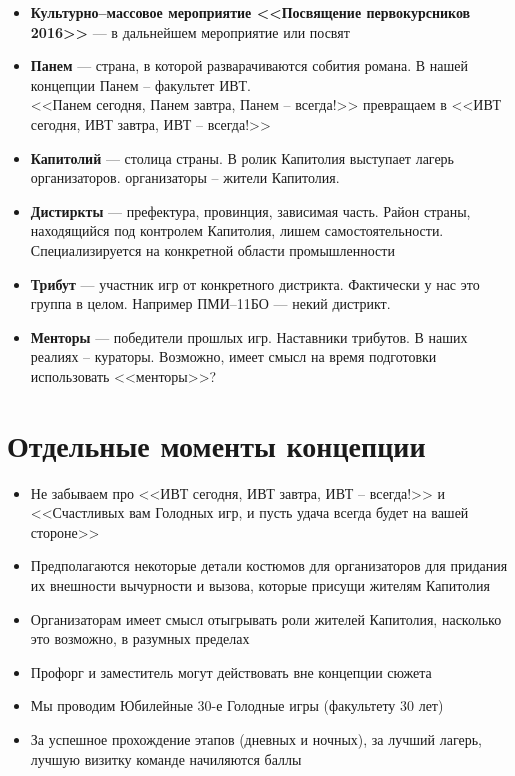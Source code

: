 \documentclass[a4paper, 14pt]{extarticle}
\theoremstyle{definition}
\begin{document}
\begin{itemize}
\item \textbf{Культурно--массовое мероприятие <<Посвящение первокурсников 2016>>} --- в дальнейшем мероприятие или посвят

\item \textbf{Панем} --- страна, в которой разварачиваются собития романа. В нашей концепции Панем -- факультет ИВТ.\\<<Панем сегодня, Панем завтра, Панем -- всегда!>> превращаем в <<ИВТ сегодня, ИВТ завтра, ИВТ -- всегда!>>

\item \textbf{Капитолий} --- столица страны. В ролик Капитолия выступает лагерь организаторов. организаторы -- жители Капитолия.

\item \textbf{Дистиркты} --- префектура, провинция, зависимая часть. Район страны, находящийся под контролем Капитолия, лишем самостоятельности. Специализируется на конкретной области промышленности

\item \textbf{Трибут} --- участник игр от конкретного дистрикта. Фактически у нас это группа в целом. Например ПМИ--11БО --- некий дистрикт.

\item \textbf{Менторы} --- победители прошлых игр. Наставники трибутов. В наших реалиях -- кураторы. Возможно, имеет смысл на время подготовки использовать <<менторы>>?


\end{itemize}

\cleardoublepage
{}
{}
\section*{Отдельные моменты концепции}

\begin{itemize}
\item Не забываем про <<ИВТ сегодня, ИВТ завтра, ИВТ -- всегда!>> и <<Счастливых вам Голодных игр, и пусть удача всегда будет на вашей стороне>>

\item Предполагаются некоторые детали костюмов для организаторов для придания их внешности вычурности и вызова, которые присущи жителям Капитолия

\item Организаторам имеет смысл отыгрывать роли жителей Капитолия, насколько это возможно, в разумных пределах

\item Профорг и заместитель могут действовать вне концепции сюжета

\item Мы проводим Юбилейные 30-е Голодные игры (факультету 30 лет)

\item За успешное прохождение этапов (дневных и ночных), за лучший лагерь, лучшую визитку команде начиляются баллы
\end{itemize}
\end{document}

